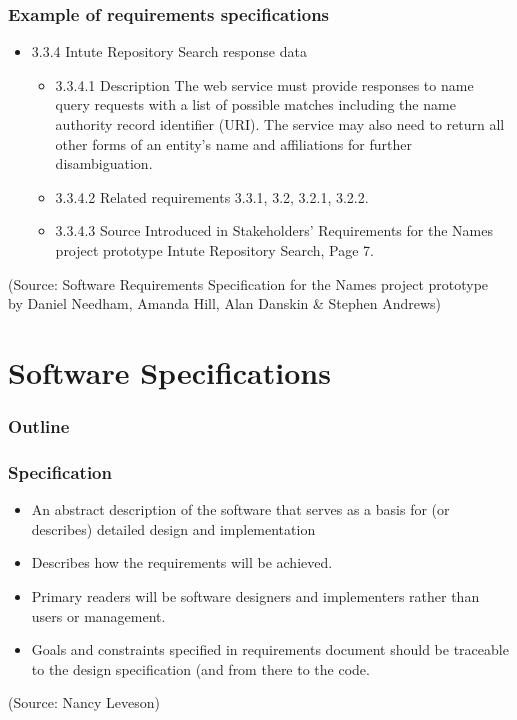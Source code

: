 \documentclass[10pt]{beamer}
\begin{document}
\begin{frame}[fragile]
  \frametitle{Example of requirements specifications}
  \begin{itemize}
  \item 3.3.4 Intute Repository Search response data
    \begin{itemize}
    \item 3.3.4.1 Description
      The web service must provide responses to name query requests with a list of
      possible matches including the name authority record identifier (URI).
      The service may also need to return all other forms of an entity's name and
      affiliations for further disambiguation.
    \item 3.3.4.2 Related requirements
      3.3.1, 3.2, 3.2.1, 3.2.2.
    \item 3.3.4.3 Source
      Introduced in Stakeholders' Requirements for the Names project prototype
      Intute Repository Search, Page 7.
    \end{itemize}
  \end{itemize}

  \tiny (Source: Software Requirements Specification for the Names project
  prototype \\ by Daniel Needham, Amanda Hill, Alan Danskin \& Stephen Andrews)
\end{frame}

\section{Software Specifications}

\begin{frame}
  \frametitle{Outline}
  \tableofcontents[currentsection]
\end{frame}

\begin{frame}[fragile]
  \frametitle{Specification}
  \begin{itemize}
  \item An abstract description of the software that serves as a
    basis for (or describes) detailed design and implementation
  \item Describes how the requirements will be achieved.
  \item Primary readers will be software designers and
    implementers rather than users or management.
  \item Goals and constraints specified in requirements document
    should be traceable to the design specification (and from
    there to the code.
  \end{itemize}
\tiny (Source: Nancy Leveson)
\end{frame}
\end{document}

